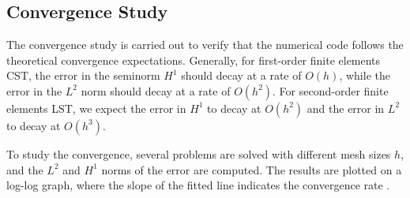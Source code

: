 \subsection{Convergence Study}

The convergence study is carried out to verify that the numerical code follows the theoretical convergence expectations. Generally, for first-order finite elements CST, the error in the seminorm \(H^1\) should decay at a rate of \(O(h)\), while the error in the \(L^2\) norm should decay at a rate of \(O(h^2)\). For second-order finite elements LST, we expect the error in \(H^1\) to decay at \(O(h^2)\) and the error in \(L^2\) to decay at \(O(h^3)\).

To study the convergence, several problems are solved with different mesh sizes \(h\), and the \(L^2\) and \(H^1\) norms of the error are computed. The results are plotted on a log-log graph, where the slope of the fitted line indicates the convergence rate \cite{convergence_study}.
